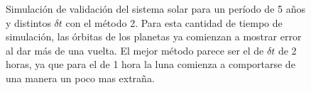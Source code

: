 \begin{figure}
{	\label{fig:ej2_m2_1825_12}
	}
	\caption{
		Simulación de validación del sistema solar para un período de 5 años y distintos $\delta t$
		con el método 2.
		Para esta cantidad de tiempo de simulación, las órbitas de los planetas ya comienzan a mostrar error al dar más de una vuelta.
		El mejor método parece ser el de $\delta t$ de 2 horas, ya que para el de 1 hora la luna comienza a comportarse de una manera un poco mas extraña.
	}
	\label{ fig:res_ej2_m2_1825 }
\end{figure}
